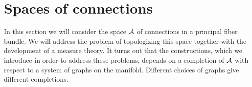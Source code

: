 \documentclass[12pt]{article}
\def\ca{{\cal A}}
\begin{document}





\section{Spaces of connections} \label{sam}
 In this section we will consider the space $\ca$ of connections in a principal fiber bundle. We will address the problem of topologizing this space together with the development of a measure theory. It turns out that the constructions, which we introduce in order to address these problems, depends on a completion of $\ca$ with respect to a system of graphs on the manifold. Different choices of graphs give different completions.  
\end{document}
